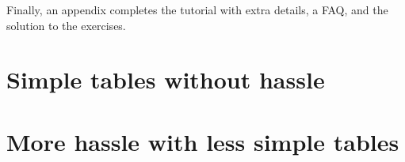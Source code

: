 \documentclass[oneside]{book}
\begin{document}
Finally, an appendix completes the tutorial with extra details, a FAQ, and the solution to the exercises.

\tableofcontents


\part{Simple tables without hassle}




\part{More hassle with less simple tables}






\appendix
{}







\end{document}
